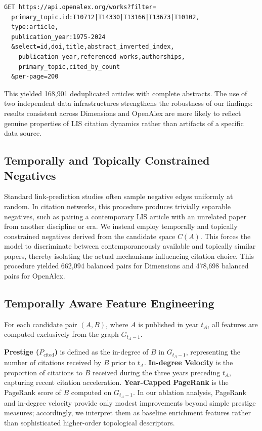 \documentclass[11pt,a4paper]{article}
\begin{document}
\begin{verbatim}
GET https://api.openalex.org/works?filter=
  primary_topic.id:T10712|T14330|T13166|T13673|T10102,
  type:article,
  publication_year:1975-2024
  &select=id,doi,title,abstract_inverted_index,
    publication_year,referenced_works,authorships,
    primary_topic,cited_by_count
  &per-page=200
\end{verbatim}

This yielded 168,901 deduplicated articles with complete abstracts. The use of two independent data infrastructures strengthens the robustness of our findings: results consistent across Dimensions and OpenAlex are more likely to reflect genuine properties of LIS citation dynamics rather than artifacts of a specific data source.

\subsection{Temporally and Topically Constrained Negatives}

Standard link-prediction studies often sample negative edges uniformly at random. In citation networks, this procedure produces trivially separable negatives, such as pairing a contemporary LIS article with an unrelated paper from another discipline or era. We instead employ temporally and topically constrained negatives derived from the candidate space \(C(A)\). This forces the model to discriminate between contemporaneously available and topically similar papers, thereby isolating the actual mechanisms influencing citation choice. This procedure yielded 662,094 balanced pairs for Dimensions and 478,698 balanced pairs for OpenAlex.

\subsection{Temporally Aware Feature Engineering}

For each candidate pair \((A,B)\), where \(A\) is published in year \(t_A\), all features are computed exclusively from the graph \(G_{t_A-1}\).

\textbf{Prestige (\(P_{\mathrm{cited}}\))} is defined as the in-degree of \(B\) in \(G_{t_A-1}\), representing the number of citations received by \(B\) prior to \(t_A\). \textbf{In-degree Velocity} is the proportion of citations to \(B\) received during the three years preceding \(t_A\), capturing recent citation acceleration. \textbf{Year-Capped PageRank} is the PageRank score of \(B\) computed on \(G_{t_A-1}\). In our ablation analysis, PageRank and in-degree velocity provide only modest improvements beyond simple prestige measures; accordingly, we interpret them as baseline enrichment features rather than sophisticated higher-order topological descriptors.
\end{document}
